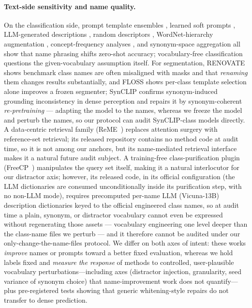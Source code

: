 \documentclass[11pt]{article}
\begin{document}
\paragraph{Text-side sensitivity and name quality.} On the classification side, prompt
template ensembles \citep{radford2021clip}, learned soft prompts \citep{zhou2022coop},
LLM-generated descriptions
\citep{pratt2023cupl}, random descriptors \citep{roth2023waffle}, WordNet-hierarchy
augmentation \citep{ge2023hierarchy}, concept-frequency analyses
\citep{parashar2024neglected}, and synonym-space aggregation \citep{yin2026s3} all show
that name phrasing shifts zero-shot accuracy; vocabulary-free classification
\citep{conti2023vocabularyfree} questions the given-vocabulary assumption itself. For
segmentation, RENOVATE \citep{huang2024renovating} shows benchmark class names are
often misaligned with masks and that \emph{renaming} them changes results
substantially, and FLOSS \citep{benigmim2025floss} shows per-class template selection
alone improves a frozen segmenter; SynCLIP \citep{wang2026synclip}
confirms synonym-induced grounding inconsistency in dense perception and
repairs it by synonym-coherent \emph{re-pretraining} --- adapting the model
to the names, whereas we freeze the model and perturb the names, so our
protocol can audit SynCLIP-class models directly. A data-centric retrieval
family (ReME~\citep{xuan2025reme}) replaces attention surgery with
reference-set retrieval; its released repository contains no method code
at audit time, so it is not among our anchors, but its name-mediated retrieval
interface makes it a natural future audit subject. A training-free class-purification
plugin (FreeCP~\citep{freecp2025}) manipulates the query set itself, making
it a natural interlocutor for our distractor axis; however, its released
code, in its official configuration (the LLM dictionaries are consumed
unconditionally inside its purification step, with no non-LLM mode), requires
precomputed per-name LLM (Vicuna-13B) description
dictionaries keyed to the official engineered class names, so at audit time a plain,
synonym, or distractor vocabulary cannot even be expressed without
regenerating those assets --- vocabulary engineering one level deeper than
the class-name files we perturb --- and it therefore cannot be audited
under our only-change-the-name-files protocol. We differ on both axes of intent: these works
\emph{improve} names or prompts toward a better fixed evaluation, whereas we hold
labels fixed and \emph{measure the response} of methods to controlled, user-plausible
vocabulary perturbations---including axes (distractor injection, granularity, seed
variance of synonym choice) that name-improvement work does not quantify---plus
pre-registered tests showing that generic whitening-style repairs do not transfer to
dense prediction.
\end{document}
